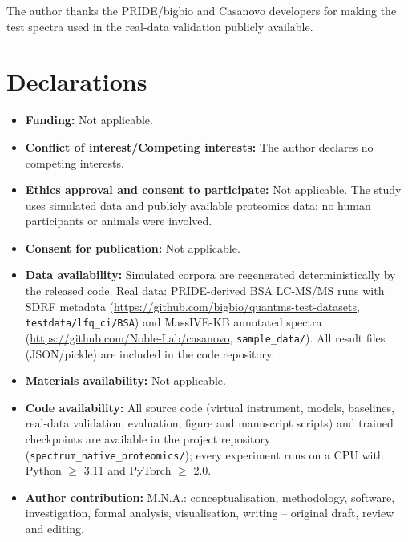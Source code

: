 \documentclass{sn-preview}
\begin{document}
\backmatter

The author thanks the PRIDE/bigbio and Casanovo developers for making the test spectra used in the real-data validation publicly available.

\section*{Declarations}

\begin{itemize}
\item \textbf{Funding:} Not applicable.
\item \textbf{Conflict of interest/Competing interests:} The author declares no competing interests.
\item \textbf{Ethics approval and consent to participate:} Not applicable. The study uses simulated data and publicly available proteomics data; no human participants or animals were involved.
\item \textbf{Consent for publication:} Not applicable.
\item \textbf{Data availability:} Simulated corpora are regenerated deterministically by the released code. Real data: PRIDE-derived BSA LC-MS/MS runs with SDRF metadata (\url{https://github.com/bigbio/quantms-test-datasets}, \texttt{testdata/lfq\_ci/BSA}) and MassIVE-KB annotated spectra (\url{https://github.com/Noble-Lab/casanovo}, \texttt{sample\_data/}). All result files (JSON/pickle) are included in the code repository.
\item \textbf{Materials availability:} Not applicable.
\item \textbf{Code availability:} All source code (virtual instrument, models, baselines, real-data validation, evaluation, figure and manuscript scripts) and trained checkpoints are available in the project repository (\texttt{spectrum\_native\_proteomics/}); every experiment runs on a CPU with Python $\geq$ 3.11 and PyTorch $\geq$ 2.0.
\item \textbf{Author contribution:} M.N.A.: conceptualisation, methodology, software, investigation, formal analysis, visualisation, writing -- original draft, review and editing.
\end{itemize}



\end{document}
